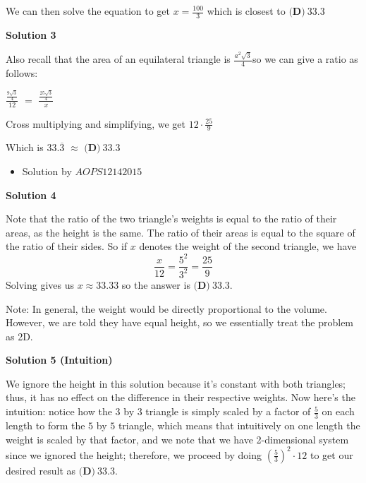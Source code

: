 \begin{enumerate}
 We can then solve the equation to get $x=\frac{100}{3}$ which is closest to $\boxed{\textbf{(D)}\ 33.3}$




\textbf{Solution 3}

Also recall that the area of an equilateral triangle is $\frac{a^2\sqrt3}{4}$so we can give a ratio as follows:

 
$\frac{\frac{9\sqrt3}{4}}{12}$ $=$ $\frac{\frac{25\sqrt3}{4}}{x}$

 Cross multiplying and simplifying, we get $12 \cdot \frac{25}{9}$

 Which is $33.\overline{3}$ $\approx$ $\boxed{\textbf{(D)}\ 33.3}$

            \begin{itemize}
        \item Solution by $AOPS12142015$
            \end{itemize}
            



\textbf{Solution 4}

Note that the ratio of the two triangle's weights is equal to the ratio of their areas, as the height is the same. The ratio of their areas is equal to the square of the ratio of their sides. So if $x$ denotes the  weight of the second triangle, we have 
 \[\frac{x}{12}=\frac{5^2}{3^2}=\frac{25}{9}\] Solving gives us $x \approx 33.33$ so the answer is $\boxed{\textbf{(D)}\ 33.3}$.

 


 Note: In general, the weight would be directly proportional to the volume. However, we are told they have equal height, so we essentially treat the problem as 2D.

 



\textbf{Solution 5 (Intuition)}

We ignore the height in this solution because it's constant with both triangles; thus, it has no effect on the difference in their respective weights. Now here's the intuition: notice how the $3$ by $3$ triangle is simply scaled by a factor of $\frac{5}{3}$ on each length to form the $5$ by $5$ triangle, which means that intuitively on one length the weight is scaled by that factor, and we note that we have 2-dimensional system since we ignored the height; therefore, we proceed by doing $\left(\frac{5}{3}\right)^2 \cdot 12$ to get our desired result as  $\boxed{\textbf{(D)}\ 33.3}$.

 



\end{enumerate}
